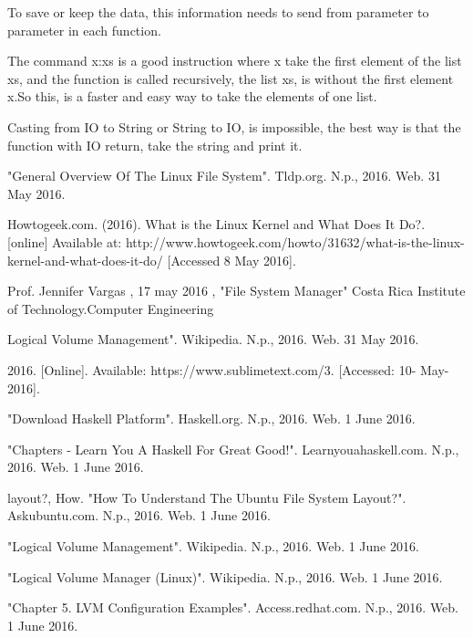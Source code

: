 \documentclass{aes2e}
\begin{document}
To save or keep the data, this information needs to send from parameter to parameter in each function.\newline

The command x:xs is a good instruction where x take the first element of the list xs, and the function is called recursively, the list xs, is without the first element x.So this, is a faster  and easy way to take the elements of one list.\newline

Casting from IO to String or String to IO, is impossible, the best way is that the function with IO return, take the string and print it.\newline





\begin{thebibliography}{99}


"General Overview Of The Linux File System". Tldp.org. N.p., 2016. Web. 31 May 2016.

Howtogeek.com. (2016). What is the Linux Kernel and What Does It Do?. [online] Available at: http://www.howtogeek.com/howto/31632/what-is-the-linux-kernel-and-what-does-it-do/ [Accessed 8 May 2016].


Prof. Jennifer Vargas , 17 may  2016 , "File System Manager" Costa Rica Institute of Technology.Computer Engineering

Logical Volume Management". Wikipedia. N.p., 2016. Web. 31 May 2016.

2016. [Online]. Available: https://www.sublimetext.com/3. [Accessed: 10- May- 2016].

"Download Haskell Platform". Haskell.org. N.p., 2016. Web. 1 June 2016.

"Chapters - Learn You A Haskell For Great Good!". Learnyouahaskell.com. N.p., 2016. Web. 1 June 2016.

 layout?, How. "How To Understand The Ubuntu File System Layout?". Askubuntu.com. N.p., 2016. Web. 1 June 2016.
 
 "Logical Volume Management". Wikipedia. N.p., 2016. Web. 1 June 2016.
 
 "Logical Volume Manager (Linux)". Wikipedia. N.p., 2016. Web. 1 June 2016.
 
 "Chapter 5. LVM Configuration Examples". Access.redhat.com. N.p., 2016. Web. 1 June 2016.
 

\end{thebibliography}
\end{document}
